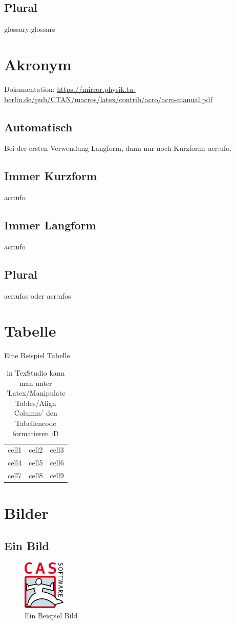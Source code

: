 \subsection{Plural}
\Glspl{glossary:glossar}

\section{Akronym}
Dokumentation: \url{https://mirror.physik.tu-berlin.de/pub/CTAN/macros/latex/contrib/acro/acro-manual.pdf} 
\subsection{Automatisch}
Bei der ersten Verwendung Langform, dann nur noch Kurzform: \Ac{acr:ufo}.
\subsection{Immer Kurzform}
\acs{acr:ufo}
\subsection{Immer Langform}
\acf{acr:ufo}
\subsection{Plural}
\acsp{acr:ufo} oder \acfp{acr:ufo}

\section{Tabelle}
\begin{table}[H]
	\caption{Eine Beispiel Tabelle}
	\centering
	\begin{tabular}{ |c|c|c| } 
		\hline
		cell1 & cell2 & cell3 \\ 
		cell4 & cell5 & cell6 \\ 
		cell7 & cell8 & cell9 \\ 
		\hline
	\end{tabular}
	\label{Table:Beispiel}
	\caption[Meine Tabelle]{in TexStudio kann man unter 'Latex/Manipulate Tables/Align Columns' den Tabellencode formatieren :D}
\end{table}

\section{Bilder}
\subsection{Ein Bild}
\begin{figure}[H]
	\centering
	\includegraphics[width=2cm]{kapitel/offizielles/img/cas}
	\caption{Ein Beispiel Bild}
	\label{Image:Beispiel1}
\end{figure}

